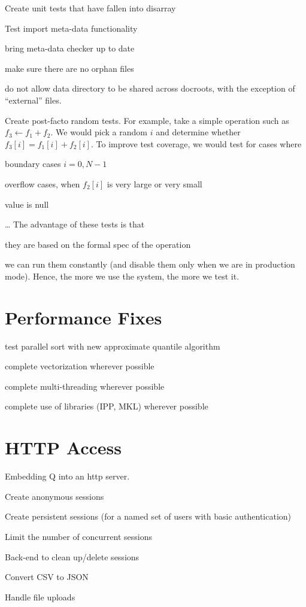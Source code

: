 \bi
\item Create unit tests that have fallen into disarray
\item Test import meta-data functionality
\item bring meta-data checker up to date
\be
\item make sure there are no orphan files
\item do not allow data directory to be shared across docroots, with the
exception of ``external'' files.
\ee
\item Create post-facto random tests. For example, take a simple
operation such as \(f_3 \leftarrow f_1 + f_2\). We would pick a random
\(i\) and determine whether \(f_3[i] = f_1[i] + f_2[i]\). To improve
test coverage, we would test for cases where 
\be
\item boundary cases \(i = 0, N-1\)
\item overflow cases, when \(f_2[i]\) is very large or very small
\item value is null
\item \ldots
\ee
The advantage of these tests is that 
\be
\item they are based on the formal spec of the operation
\item we can run them constantly (and disable them only when we are in
production mode). Hence, the more we use the system, the more we
test it.
\ee
\ei

\section{Performance Fixes}
\label{Performance_Fixes}

\be
\item test parallel sort with new approximate quantile algorithm
\item complete vectorization wherever possible
\item complete multi-threading wherever possible
\item complete use of libraries  (IPP, MKL) wherever possible
\ee


\section{HTTP Access}
\label{HTTP}
Embedding Q into an http server.

\bi
\item Create anonymous sessions
\item Create persistent sessions (for a named set of users with basic
    authentication)
\item Limit the number of concurrent sessions
\item Back-end to clean up/delete sessions
\item Convert CSV to JSON
\item Handle file uploads
\ei

